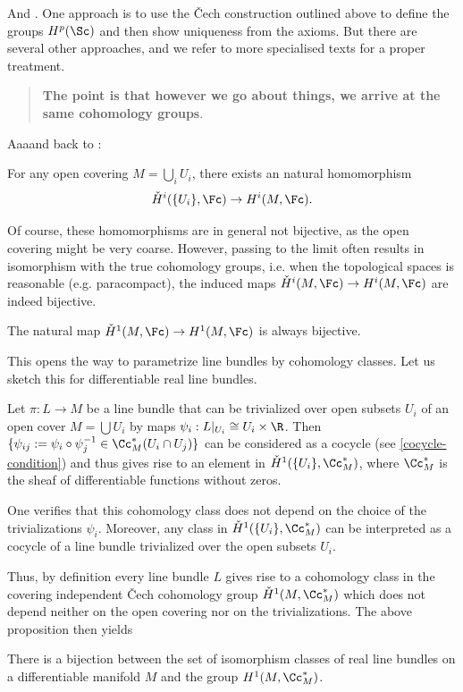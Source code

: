 And \cite{donaldson}. One approach is to use the \v Cech construction outlined above to define the groups $H^p(\Sc)$ and then show uniqueness from the axioms. But there are several other approaches, and we refer to more specialised texts for a proper treatment.

\begin{quote}
	{\color{red}\textbf{The point is that however we go about things, we arrive at the same cohomology groups}.}
\end{quote}

Aaaand back to \cite{huybrechts}:
\begin{prop}
	For any open covering $M=\bigcup_iU_i$, there exists an natural homomorphism
	\[\check{H}^i(\{U_i\},\Fc)\to H^i(M,\Fc).\]
\end{prop}
Of course, these homomorphisms are in general not bijective, as the open
covering might be very coarse. However, passing to the limit often results in isomorphism with the true cohomology groups, i.e. when the topological spaces is reasonable (e.g. paracompact), the induced maps $\check{H}^i(M,\Fc)\to H^i(M,\Fc)$ are indeed bijective.
\begin{prop}
	The natural map $\check{H}^1(M,\Fc)\to H^1(M,\Fc)$ is always bijective.
\end{prop}
This opens the way to parametrize line bundles by cohomology classes. Let us sketch this for differentiable real line bundles.

Let $\pi:L\to M$ be a line bundle that can be trivialized over open subsets $U_i$ of an open cover $M=\bigcup U_i$ by maps $\psi_i:L|_{U_i}\cong U_i\times \R$. Then $\{\psi_{ij}:=\psi_i\circ\psi^{-1}_j\in\Cc_M^*(U_i\cap U_j)\}$ {\color{red}can be considered as a cocycle (see \cref{cocycle-condition})} and thus gives rise to an element in $\check{H}^1(\{U_i\},\Cc_M^*)$, where $\Cc^*_M$ is the sheaf of differentiable functions without zeros.

One verifies that this cohomology class does not depend on the choice of the trivializations $\psi_i$. Moreover, any class in $\check{H}^1(\{U_i\},\Cc_M^*)$ can be interpreted as a cocycle of a line bundle trivialized over the open subsets $U_i$.

Thus, by definition every line bundle $L$ gives rise to a cohomology class in the covering independent \v Cech cohomology group $\check{H}^1(M,\Cc^*_M)$ which does not depend neither on the open covering nor on the trivializations. The above proposition then yields

\begin{coro}
	There is a bijection between the set of isomorphism classes of real line bundles on a differentiable manifold $M$ and the group $H^1(M,\Cc^*_M)$.
\end{coro}


